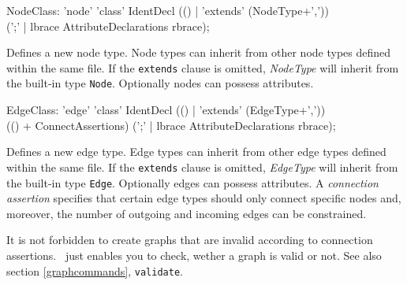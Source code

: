 \begin{rail}  
  NodeClass: 'node' 'class' IdentDecl (() | 'extends' (NodeType+',')) \\ 
    (';' | lbrace AttributeDeclarations rbrace);
\end{rail}
Defines a new node type. Node types can inherit from other node types defined within the same file. If the \texttt{extends} clause is omitted, \emph{NodeType} will inherit from the built-in type \texttt{Node}. Optionally nodes can possess attributes.

\begin{rail}    
  EdgeClass: 'edge' 'class' IdentDecl (() | 'extends' (EdgeType+',')) \\
    (() + ConnectAssertions) (';' | lbrace AttributeDeclarations rbrace);
\end{rail}
Defines a new edge type. Edge types can inherit from other edge types defined within the same file. If the \texttt{extends} clause is omitted, \emph{EdgeType} will inherit from the built-in type \texttt{Edge}. Optionally edges can possess attributes. A \emph{connection assertion} specifies that certain edge types should only connect specific nodes and, moreover, the number of outgoing and incoming edges can be constrained.

\begin{note}
It is not forbidden to create graphs that are invalid according to connection assertions. \GrG\ just enables you to check, wether a graph is valid or not. See also section \ref{graphcommands}, \texttt{validate}.
\end{note}

